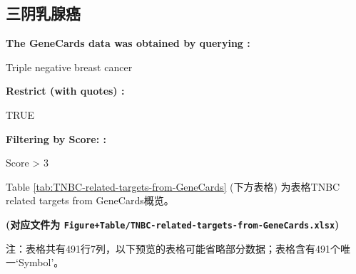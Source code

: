 \documentclass[
]{article}
\begin{document}
\hypertarget{ux4e09ux9634ux4e73ux817aux764c}{%
\subsection{三阴乳腺癌}\label{ux4e09ux9634ux4e73ux817aux764c}}

\begin{center}\begin{tcolorbox}[colback=gray!10, colframe=gray!50, width=0.9\linewidth, arc=1mm, boxrule=0.5pt]
\textbf{
The GeneCards data was obtained by querying
:}

\vspace{0.5em}

    Triple negative breast cancer

\vspace{2em}


\textbf{
Restrict (with quotes)
:}

\vspace{0.5em}

    TRUE

\vspace{2em}


\textbf{
Filtering by Score:
:}

\vspace{0.5em}

    Score > 3

\vspace{2em}
\end{tcolorbox}
\end{center}

Table \ref{tab:TNBC-related-targets-from-GeneCards} (下方表格) 为表格TNBC related targets from GeneCards概览。

\textbf{(对应文件为 \texttt{Figure+Table/TNBC-related-targets-from-GeneCards.xlsx})}

\begin{center}\begin{tcolorbox}[colback=gray!10, colframe=gray!50, width=0.9\linewidth, arc=1mm, boxrule=0.5pt]注：表格共有491行7列，以下预览的表格可能省略部分数据；表格含有491个唯一`Symbol'。
\end{tcolorbox}
\end{center}
\end{document}
